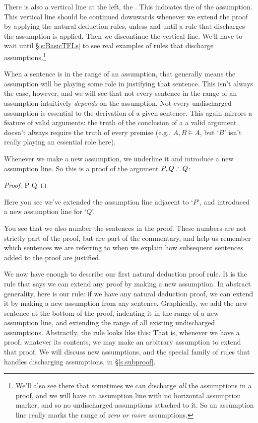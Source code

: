 There is also a vertical line at the left, the . This indicates the  of the assumption. This vertical line should be continued downwards whenever we extend the proof by applying the natural deduction rules, unless and until a rule that discharges the assumption is applied. Then we discontinue the vertical line. We'll have to wait until §\ref{s:BasicTFLs} to see real examples of rules that discharge assumptions.\footnote{We'll also see there that sometimes we can discharge \emph{all} the assumptions in a proof, and we will have an assumption line with no horizontal assumption marker, and so no undischarged assumptions attached to it. So an assumption line really marks the range of \emph{zero or more} assumptions.} 

When a sentence is in the range of an assumption, that generally means the assumption will be playing some role in justifying that sentence. This isn't always the case, however, and we will see that not every sentence in the range of an assumption intuitively \emph{depends} on the assumption. Not every undischarged assumption is essential to the derivation of a given sentence. \label{nondependence} This again mirrors a feature of valid arguments: the truth of the conclusion of a a valid argument doesn't always require the truth of every premise (e.g., $A, B \vDash A$, but `$B$' isn't really playing an essential role here). 

Whenever we make a new assumption, we underline it and introduce a new assumption line. So this is a proof of the argument $P, Q \mathrel{\therefore} Q$: \begin{proof}
	 P
	\open
	 Q
\end{proof}
Here you see we've extended the assumption line adjacent to `$P$', and introduced a new assumption line for `$Q$'. 

You see that we also number the sentences in the proof. These numbers are not strictly part of the proof, but are part of the commentary, and help us remember which sentences we are referring to when we explain how subsequent sentences added to the proof are justified.

We now have enough to describe our first natural deduction proof rule. It is the rule that says we can extend any proof by making a new assumption. In abstract generality, here is our  rule\label{newass}: if we have any natural deduction proof, we can extend it by making a new assumption from any sentence. Graphically, we add the new sentence at the bottom of the proof, indenting it in the range of a new assumption line, and extending the range of all existing undischarged assumptions.  Abstractly, the rule looks like this:
That is, whenever we have a proof, whatever its contents, we may make an arbitrary assumption to extend that proof. We will discuss new assumptions, and the special family of rules that handles discharging assumptions, in §\ref{s.subproof}.

